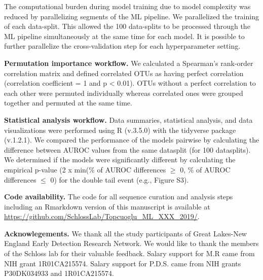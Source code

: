 \documentclass[11pt,]{article}
\begin{document}
The computational burden during model training due to model complexity
was reduced by parallelizing segments of the ML pipeline. We
parallelized the training of each data-split. This allowed the 100
data-splits to be processed through the ML pipeline simultaneously at
the same time for each model. It is possible to further parallelize the
cross-validation step for each hyperparameter setting.

\textbf{Permutation importance workflow.} We calculated a Spearman's
rank-order correlation matrix and defined correlated OTUs as having
perfect correlation (correlation coefficient = 1 and p \textless{}
0.01). OTUs without a perfect correlation to each other were permuted
individually whereas correlated ones were grouped together and permuted
at the same time.

\textbf{Statistical analysis workflow.} Data summaries, statistical
analysis, and data visualizations were performed using R (v.3.5.0) with
the tidyverse package (v.1.2.1). We compared the performance of the
models pairwise by calculating the difference between AUROC values from
the same datasplit (for 100 datasplits). We determined if the models
were significantly different by calculating the empirical p-value (2 x
min(\% of AUROC differences \(\geq\) 0, \% of AUROC differences \(\leq\)
0) for the double tail event (e.g., Figure S3).

\textbf{Code availability.} The code for all sequence curation and
analysis steps including an Rmarkdown version of this manuscript is
available at \url{https://github.com/SchlossLab/Topcuoglu_ML_XXX_2019/}.

\textbf{Acknowlegements.} We thank all the study participants of Great
Lakes-New England Early Detection Research Network. We would like to
thank the members of the Schloss lab for their valuable feedback. Salary
support for M.R came from NIH grant 1R01CA215574. Salary support for
P.D.S. came from NIH grants P30DK034933 and 1R01CA215574.

\newpage
\end{document}
